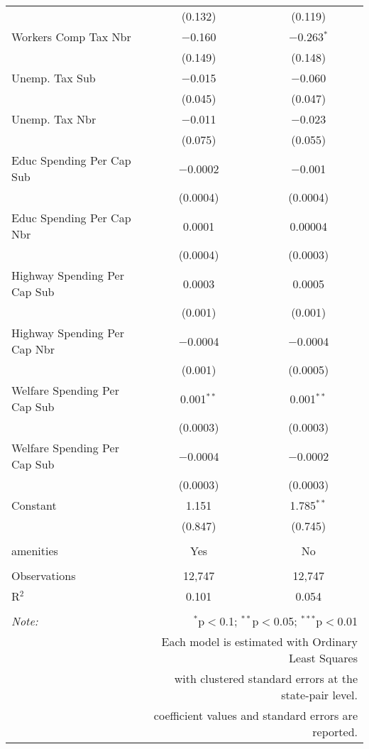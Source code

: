 \begin{table}[!htbp]
\begin{tabular}{@{\extracolsep{5pt}}lcc}
  & (0.132) & (0.119) \\ 
  Workers Comp Tax Nbr & $-$0.160 & $-$0.263$^{*}$ \\ 
  & (0.149) & (0.148) \\ 
  Unemp. Tax Sub & $-$0.015 & $-$0.060 \\ 
  & (0.045) & (0.047) \\ 
  Unemp. Tax Nbr & $-$0.011 & $-$0.023 \\ 
  & (0.075) & (0.055) \\ 
  Educ Spending Per Cap Sub & $-$0.0002 & $-$0.001 \\ 
  & (0.0004) & (0.0004) \\ 
  Educ Spending Per Cap Nbr & 0.0001 & 0.00004 \\ 
  & (0.0004) & (0.0003) \\ 
  Highway Spending Per Cap Sub & 0.0003 & 0.0005 \\ 
  & (0.001) & (0.001) \\ 
  Highway Spending Per Cap Nbr & $-$0.0004 & $-$0.0004 \\ 
  & (0.001) & (0.0005) \\ 
  Welfare Spending Per Cap Sub & 0.001$^{**}$ & 0.001$^{**}$ \\ 
  & (0.0003) & (0.0003) \\ 
  Welfare Spending Per Cap Sub & $-$0.0004 & $-$0.0002 \\ 
  & (0.0003) & (0.0003) \\ 
  Constant & 1.151 & 1.785$^{**}$ \\ 
  & (0.847) & (0.745) \\ 
 \hline \\[-1.8ex] 
amenities & Yes & No \\ 
\hline \\[-1.8ex] 
Observations & 12,747 & 12,747 \\ 
R$^{2}$ & 0.101 & 0.054 \\ 
\hline 
\hline \\[-1.8ex] 
\textit{Note:}  & \multicolumn{2}{r}{$^{*}$p$<$0.1; $^{**}$p$<$0.05; $^{***}$p$<$0.01} \\ 
 & \multicolumn{2}{r}{Each model is estimated with Ordinary Least Squares} \\ 
 & \multicolumn{2}{r}{with clustered standard errors at the state-pair level.} \\ 
 & \multicolumn{2}{r}{coefficient values and standard errors are reported.} \\ 
\end{tabular} 
\end{table} 
